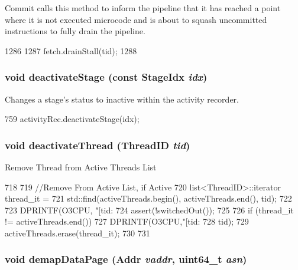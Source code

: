 Commit calls this method to inform the pipeline that it has reached a point where it is not executed microcode and is about to squash uncommitted instructions to fully drain the pipeline. 


\begin{DoxyCode}
1286 {
1287     fetch.drainStall(tid);
1288 }
\end{DoxyCode}
\hypertarget{classFullO3CPU_a9ebbaf1718ed44d77051269c9734f6ae}{
\subsubsection[{deactivateStage}]{\setlength{\rightskip}{0pt plus 5cm}void deactivateStage (const {\bf StageIdx} {\em idx})}}
\label{classFullO3CPU_a9ebbaf1718ed44d77051269c9734f6ae}
Changes a stage's status to inactive within the activity recorder. 


\begin{DoxyCode}
759     { activityRec.deactivateStage(idx); }
\end{DoxyCode}
\hypertarget{classFullO3CPU_ad11d9216ad92d9036ebf37844cf6e706}{
\subsubsection[{deactivateThread}]{\setlength{\rightskip}{0pt plus 5cm}void deactivateThread ({\bf ThreadID} {\em tid})}}
\label{classFullO3CPU_ad11d9216ad92d9036ebf37844cf6e706}
Remove Thread from Active Threads List 


\begin{DoxyCode}
718 {
719     //Remove From Active List, if Active
720     list<ThreadID>::iterator thread_it =
721         std::find(activeThreads.begin(), activeThreads.end(), tid);
722 
723     DPRINTF(O3CPU, "[tid:%
724     assert(!switchedOut());
725 
726     if (thread_it != activeThreads.end()) {
727         DPRINTF(O3CPU,"[tid:%
728                 tid);
729         activeThreads.erase(thread_it);
730     }
731 }
\end{DoxyCode}
\hypertarget{classFullO3CPU_a26789603cc94992d18f8ddedfff96acf}{
\subsubsection[{demapDataPage}]{\setlength{\rightskip}{0pt plus 5cm}void demapDataPage ({\bf Addr} {\em vaddr}, \/  uint64\_\-t {\em asn})}}
\label{classFullO3CPU_a26789603cc94992d18f8ddedfff96acf}




